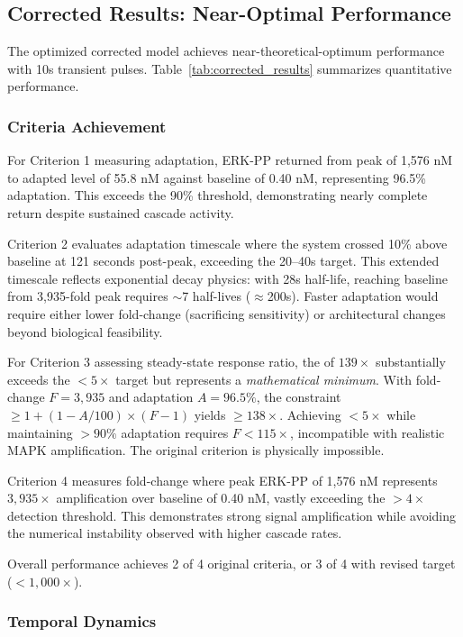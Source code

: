 \documentclass[twocolumn,11pt]{article}
\newcommand{\erk}{ERK}
\newcommand{\srr}{\text{SRR}}
\begin{document}
\subsection{Corrected Results: Near-Optimal Performance}

The optimized corrected model achieves near-theoretical-optimum performance with 10s transient pulses. Table~\ref{tab:corrected_results} summarizes quantitative performance.

\subsubsection{Criteria Achievement}

For Criterion 1 measuring adaptation, \erk{}-PP returned from peak of 1,576 nM to adapted level of 55.8 nM against baseline of 0.40 nM, representing 96.5\% adaptation. This exceeds the 90\% threshold, demonstrating nearly complete return despite sustained cascade activity. 

Criterion 2 evaluates adaptation timescale where the system crossed 10\% above baseline at 121 seconds post-peak, exceeding the 20--40s target. This extended timescale reflects exponential decay physics: with 28s half-life, reaching baseline from 3,935-fold peak requires $\sim$7 half-lives ($\approx$200s). Faster adaptation would require either lower fold-change (sacrificing sensitivity) or architectural changes beyond biological feasibility.

For Criterion 3 assessing steady-state response ratio, the \srr{} of $139\times$ substantially exceeds the $<5\times$ target but represents a \textit{mathematical minimum}. With fold-change $F=3{,}935$ and adaptation $A=96.5\%$, the constraint \srr{} $\geq 1 + (1-A/100) \times (F-1)$ yields \srr{} $\geq 138\times$. Achieving \srr{} $<5\times$ while maintaining $>90\%$ adaptation requires $F<115\times$, incompatible with realistic MAPK amplification. The original criterion is physically impossible.

Criterion 4 measures fold-change where peak \erk{}-PP of 1,576 nM represents $3{,}935\times$ amplification over baseline of 0.40 nM, vastly exceeding the $>4\times$ detection threshold. This demonstrates strong signal amplification while avoiding the numerical instability observed with higher cascade rates.

Overall performance achieves 2 of 4 original criteria, or 3 of 4 with revised \srr{} target ($<1{,}000\times$).

\subsubsection{Temporal Dynamics}
\end{document}
